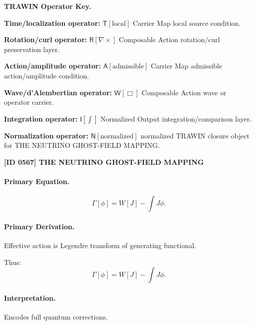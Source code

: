 \par\vspace{0.45\baselineskip}
\noindent\begin{minipage}[t]{\linewidth}
\begingroup
\small
\raggedright
\textbf{TRAWIN Operator Key.}\par
\noindent\textbf{Time/localization operator:} $\mathsf{T}\!\left[\mathrm{local}\right]$ Carrier Map local source condition.\par
\noindent\textbf{Rotation/curl operator:} $\mathsf{R}\!\left[\nabla\times\right]$ Composable Action rotation/curl preservation layer.\par
\noindent\textbf{Action/amplitude operator:} $\mathsf{A}\!\left[\mathrm{admissible}\right]$ Carrier Map admissible action/amplitude condition.\par
\noindent\textbf{Wave/d'Alembertian operator:} $\mathsf{W}\!\left[\Box\right]$ Composable Action wave or operator carrier.\par
\noindent\textbf{Integration operator:} $\mathsf{I}\!\left[\int\right]$ Normalized Output integration/comparison layer.\par
\noindent\textbf{Normalization operator:} $\mathsf{N}\!\left[\mathrm{normalized}\right]$ normalized TRAWIN closure object for THE NEUTRINO GHOST-FIELD MAPPING.\par
\endgroup
\end{minipage}

\clearpage
\noindent\textbf{[ID 0567] THE NEUTRINO GHOST-FIELD MAPPING}\par
\vspace{0.35em}
\paragraph{Primary Equation.}
\begin{equation}
\Gamma[\phi] = W[J] - \int J\phi.
\end{equation}

\paragraph{Primary Derivation.}
Effective action is Legendre transform of generating functional.

Thus:
\begin{equation}
\boxed{
\Gamma[\phi] = W[J] - \int J\phi.
}
\end{equation}

\paragraph{Interpretation.}
Encodes full quantum corrections.

